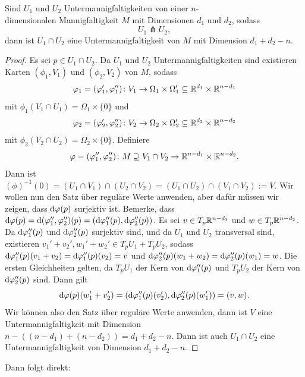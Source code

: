 \begin{prop}
    \label{prop: schnitt von transversalen untermannigfaltigkeiten}
    Sind $U_1$ und $U_2$ Untermannigfaltigkeiten von einer $n$-\\
    dimensionalen Mannigfaltigkeit $M$ mit 
    Dimensionen $d_1$ und $d_2$, sodass 
    \[ U_1 \pitchfork U_2 , \]
    dann ist $U_1 \cap U_2$ eine Untermannigfaltigkeit von $M$ mit Dimension $d_1 + d_2 - n$.
\end{prop}

\begin{proof}
    Es sei $p \in U_1 \cap U_2$. Da $U_1$ und $U_2$ Untermannigfaltigkeiten sind existieren 
    Karten $(\phi_1, V_1)$ und $(\phi_2, V_2)$ von $M$, sodass 
    \[ \varphi_1 = (\varphi_1', \varphi_1'') \colon V_1 \to 
        \Omega_1 \times \Omega_1' \subseteq { \mathbb R }^{d_1} \times { \mathbb R }^{n - d_1} \]
    mit $\phi_1(V_1 \cap U_1) = \Omega_1 \times \{ 0 \}$ und 
    \[ \varphi_2 = (\varphi_2', \varphi_2'')\colon V_2 \to 
        \Omega_2 \times \Omega_2' \subseteq { \mathbb R }^{d_2} \times { \mathbb R }^{n - d_2} \]
    mit $\phi_2(V_2 \cap U_2) = \Omega_2 \times \{ 0 \}$. Definiere 
    \[ \varphi = (\varphi_1'', \varphi_2'') \colon 
        M \supseteq V_1 \cap V_2 \to { \mathbb R }^{n - d_1} \times { \mathbb R }^{n - d_2}. \]
    Dann ist 
    $(\phi)^{-1}(0) = (U_1 \cap V_1) \cap (U_2 \cap V_2) = (U_1 \cap U_2) \cap (V_1 \cap V_2) := V$.
    Wir wollen nun den Satz über reguläre Werte anwenden, aber dafür müssen wir zeigen, dass 
    ${ \operatorname{d} } \varphi (p)$ surjektiv ist. Bemerke, dass 
    ${ \operatorname{d} } \varphi (p) = { \operatorname{d} } (\varphi''_1, \varphi''_2) (p) = ({ \operatorname{d} } \varphi''_1 (p), { \operatorname{d} } \varphi''_2 (p))$.
    Es sei $v \in T_p { \mathbb R }^{n - d_1}$ und $w \in T_p{ \mathbb R }^{n - d_2}$. Da ${ \operatorname{d} } \varphi''_1 (p)$ und 
    ${ \operatorname{d} } \varphi''_2 (p)$ surjektiv sind, und da $U_1$ und $U_2$ transversal sind, 
    existieren $v_1' + v_2', w_1' + w_2' \in T_pU_1 + T_pU_2$, sodass 
    ${ \operatorname{d} } \varphi''_1 (p) (v_1 + v_2) = { \operatorname{d} } \varphi''_1 (p) (v_2) = v$ und 
    ${ \operatorname{d} } \varphi''_2 (p) (w_1 + w_2) = { \operatorname{d} } \varphi''_2 (p) (w_1) = w$.
    Die ersten Gleichheiten gelten, da $T_p U_1$ der Kern von ${ \operatorname{d} } \varphi''_1 (p)$ und 
    $T_p U_2$ der Kern von ${ \operatorname{d} } \varphi''_2 (p)$ sind. Dann gilt
    \[ { \operatorname{d} } \varphi (p) (w_1' + v_2')  = 
        ( { \operatorname{d} } \varphi''_1 (p) (v_2'), { \operatorname{d} } \varphi''_2 (p) (w_1')) = (v, w) . \]
    Wir können also den Satz über reguläre Werte anwenden, dann ist $V$ eine Untermannigfaltigkeit
    mit Dimension $n - ((n - d_1) + (n - d_2)) = d_1 + d_2 - n$. Dann ist auch $U_1 \cap U_2$
    eine Untermannigfaltigkeit von Dimension $d_1 + d_2 - n$.
\end{proof}

Dann folgt direkt:

